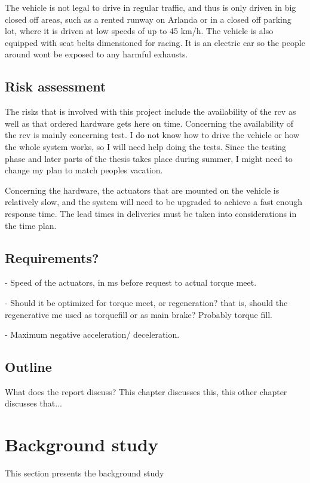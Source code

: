 \documentclass[a4paper,11pt]{kth-mag}
\begin{document}
The vehicle is not legal to drive in regular traffic, and thus is only driven in big closed off areas, such as a rented runway on Arlanda or in a closed off parking lot, where it is driven at low speeds of up to 45 km/h. The vehicle is also equipped with seat belts dimensioned for racing. 
It is an electric car so the people around wont be exposed to any harmful exhausts. 


\section{Risk assessment}
The risks that is involved with this project include the availability of the \gls{rcv} as well as that ordered hardware gets here on time. Concerning the availability of the \gls{rcv} is mainly concerning test. I do not know how to drive the vehicle or how the whole system works, so I will need help doing the tests. Since the testing phase and later parts of the thesis takes place during summer, I might need to change my plan to match peoples vacation. \newline

Concerning the hardware, the actuators that are mounted on the vehicle is relatively slow, and the system will need to be upgraded to achieve a fast enough response time. The lead times in deliveries must be taken into considerations in the time plan.

\section{Requirements?}

- Speed of the actuators, in ms before request to actual torque meet.

- Should it be optimized for torque meet, or regeneration? that is, should the regenerative me used as torquefill or as main brake? Probably torque fill.

- Maximum negative acceleration/ deceleration.

\section{Outline}
What does the report discuss?
This chapter discusses this, this other chapter discusses that...



\chapter{Background study}
This section presents the background study
\end{document}

